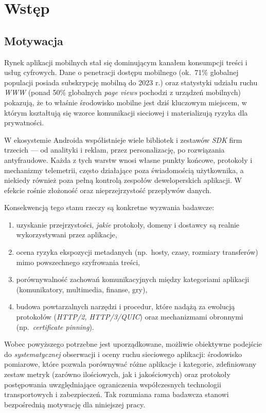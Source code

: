 \chapter{Wstęp}

\section*{Motywacja}

Rynek aplikacji mobilnych stał się dominującym kanałem konsumpcji treści i usług cyfrowych. Dane o penetracji dostępu mobilnego (ok.\ 71\% globalnej populacji posiada subskrypcję mobilną do 2023 r.) \cite{CiscoAIRWhitepaper2023} oraz statystyki udziału ruchu \emph{WWW} (ponad 50\% globalnych \emph{page views} pochodzi z urządzeń mobilnych) \cite{StatCounterPlatformShare2025} pokazują, że to właśnie środowisko mobilne jest dziś kluczowym miejscem, w którym kształtują się wzorce komunikacji sieciowej i materializują ryzyka dla prywatności.

W ekosystemie Androida współistnieje wiele bibliotek i zestawów \emph{SDK} firm trzecich — od analityki i reklam, przez personalizację, po rozwiązania antyfraudowe. Każda z tych warstw wnosi własne punkty końcowe, protokoły i mechanizmy telemetrii, często działające poza świadomością użytkownika, a niekiedy również poza pełną kontrolą zespołów deweloperskich aplikacji. W efekcie rośnie złożoność oraz nieprzejrzystość przepływów danych.

Konsekwencją tego stanu rzeczy są konkretne wyzwania badawcze:
\begin{enumerate}[label=\alph*]
  \item uzyskanie przejrzystości, \emph{jakie} protokoły, domeny i dostawcy są realnie wykorzystywani przez aplikacje,
  \item ocena ryzyka ekspozycji metadanych (np.\ hosty, czasy, rozmiary transferów) mimo powszechnego szyfrowania treści,
  \item porównywalność zachowań komunikacyjnych między kategoriami aplikacji (komunikatory, multimedia, finanse, gry),
  \item budowa powtarzalnych narzędzi i procedur, które nadążą za ewolucją protokołów (\emph{HTTP/2, HTTP/3/QUIC}) oraz mechanizmami obronnymi (np.\ \emph{certificate pinning}).
\end{enumerate}

Wobec powyższego potrzebne jest uporządkowane, możliwie obiektywne podejście do \emph{systematycznej} obserwacji i oceny ruchu sieciowego aplikacji: środowisko pomiarowe, które pozwala porównywać różne aplikacje i kategorie, zdefiniowany zestaw metryk (zarówno ilościowych, jak i jakościowych) oraz protokoły postępowania uwzględniające ograniczenia współczesnych technologii transportowych i zabezpieczeń. Tak rozumiana rama badawcza stanowi bezpośrednią motywację dla niniejszej pracy.


